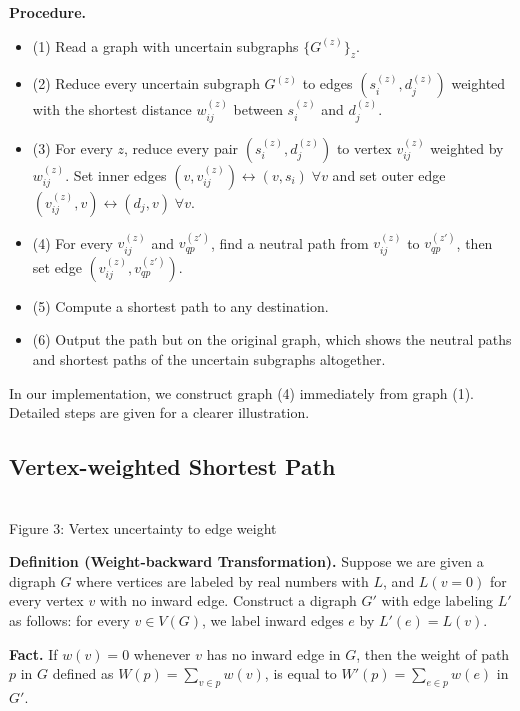 \documentclass[pdflatex,sn-mathphys-num]{sn-jnl}%
\begin{document}
\textbf{Procedure.}
\begin{itemize}
    \item (1) Read a graph with uncertain subgraphs $\{G^{(z)} \}_z$.
    \item (2) Reduce every uncertain subgraph $G^{(z)}$ to edges $(s_i^{(z)}, d_j^{(z)})$ weighted with the shortest distance $w_{ij}^{(z)}$ between $s_i^{(z)}$ and $d_j^{(z)}$.
    \item (3) For every $z$, reduce every pair $(s_i^{(z)}, d_j^{(z)})$ to vertex $v_{ij}^{(z)}$ weighted by $w_{ij}^{(z)}$. Set inner edges $(v,v_{ij}^{(z)}) \longleftrightarrow (v, s_i) \; \forall v$ and set outer edge $(v_{ij}^{(z)}, v) \longleftrightarrow (d_j, v) \; \forall v$.
    \item (4) For every $v_{ij}^{(z)}$ and $v_{qp}^{(z')}$, find a neutral path from $v_{ij}^{(z)}$ to $v_{qp}^{(z')}$, then set edge $(v_{ij}^{(z)}, v_{qp}^{(z')})$.
    \item (5) Compute a shortest path to any destination.
    \item (6) Output the path but on the original graph, which shows the neutral paths and shortest paths of the uncertain subgraphs altogether.
\end{itemize}

In our implementation, we construct graph (4) immediately from graph (1). Detailed steps are given for a clearer illustration.


\subsection{Vertex-weighted Shortest Path}

\begin{center}
     \\
    Figure 3: Vertex uncertainty to edge weight
\end{center}

\textbf{Definition (Weight-backward Transformation).} Suppose we are given a digraph $G$ where vertices are labeled by real numbers with $L$, and $L(v = 0)$ for every vertex $v$ with no inward edge. Construct a digraph $G'$ with edge labeling $L'$ as follows: for every $v \in V(G)$, we label inward edges $e$ by $L'(e) = L(v)$.

\textbf{Fact.} If $w(v) = 0$ whenever $v$ has no inward edge in $G$, then the weight of path $p$ in $G$ defined as $W(p) = \sum_{v \in p} w(v)$, is equal to $W'(p) = \sum\limits_{e \in p}w(e)$ in $G'$.
\end{document}

